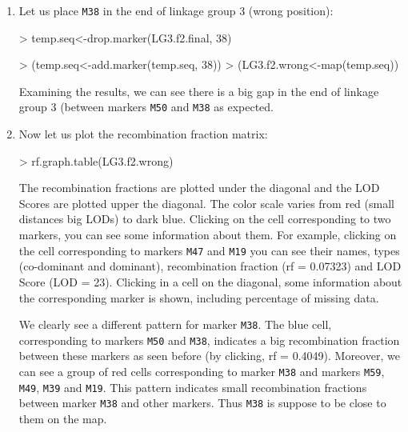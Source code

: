 \documentclass[letterpaper,12pt,oneside]{article}
\begin{document}
\begin{enumerate}
\item Let us place {\tt M38} in the end of linkage group 3 (wrong position):

\begin{Schunk}
\begin{Sinput}
> temp.seq<-drop.marker(LG3.f2.final, 38)
\end{Sinput}
\end{Schunk}

\begin{Schunk}
\begin{Sinput}
> (temp.seq<-add.marker(temp.seq, 38))
> (LG3.f2.wrong<-map(temp.seq))
\end{Sinput}
\end{Schunk}

Examining the results, we can see there is a big gap in the end of linkage group 3 (between markers {\tt M50} and {\tt M38} as expected. 

\item Now let us plot the recombination fraction matrix:

\begin{Schunk}
\begin{Sinput}
> rf.graph.table(LG3.f2.wrong)
\end{Sinput}
\end{Schunk}


The recombination fractions are plotted under the diagonal and the LOD Scores are plotted upper the diagonal. The color scale varies from red (small distances  big LODs) to dark blue. Clicking on the cell corresponding to two markers, you can see some information about them. For example, clicking on the cell corresponding to markers {\tt M47} and {\tt M19} you can see their names, types (co-dominant and dominant), recombination fraction (rf = 0.07323) and LOD Score (LOD = 23). Clicking in a cell on the diagonal, some information about the corresponding marker is shown, including percentage of missing data. 

We clearly see a different pattern for marker {\tt M38}. The blue cell, corresponding to markers {\tt M50} and {\tt M38}, indicates a big recombination fraction between these markers as seen before (by clicking, rf = 0.4049). Moreover, we can see a group of red cells corresponding to marker {\tt M38} and markers {\tt M59}, {\tt M49}, {\tt M39} and {\tt M19}. This pattern indicates small recombination fractions between marker {\tt M38} and other markers. Thus {\tt M38} is suppose to be close to them on the map. 


\end{enumerate}
\end{document}
